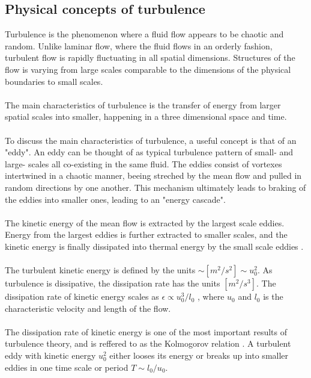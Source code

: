 \documentclass[a4paper, 12pt]{report}
\begin{document}
\subsection{Physical concepts of turbulence}
Turbulence is the phenomenon where a fluid flow appears to be chaotic and random. Unlike laminar flow, where the fluid flows in an orderly fashion, turbulent flow is rapidly fluctuating in all spatial dimensions. Structures of the flow is varying from large scales comparable to the dimensions of the physical boundaries to small scales.\\
\\
The main characteristics of turbulence is the transfer of energy from larger spatial scales into smaller, happening in a three dimensional space and time.\\
\\
 To discuss the main characteristics of turbulence, a useful concept is that of an "eddy". An eddy can be thought of as typical turbulence pattern of small- and large- scales all co-existing in the same fluid. The eddies consist of vortexes intertwined in a chaotic manner, beeing streched by the mean flow and pulled in random directions by one another. This mechanism ultimately leads to braking of the eddies into smaller ones, leading to an "energy cascade"\cite{CFD}.\\
\\
The kinetic energy of the mean flow is extracted by the largest scale eddies. Energy from the largest eddies is further extracted to smaller scales, and the kinetic energy is finally dissipated into thermal energy by the small scale eddies \cite{CFD}.\\
\\
The turbulent kinetic energy is defined by the units $\sim [m^2/s^2] \sim u_0^2$. As turbulence is dissipative, the dissipation rate has the units $[m^2/s^3]$. The dissipation rate of kinetic energy scales as $\epsilon \propto u_0^3/l_0$ \cite{Turbulence}, where $u_0$ and $l_0$ is the characteristic velocity and length of the flow.\\
\\
The dissipation rate of kinetic energy is one of the most important results of turbulence theory, and is reffered to as the Kolmogorov relation \cite{Turbulence}. A turbulent eddy with kinetic energy $u_0^2$ either looses its energy or breaks up into smaller eddies in one time scale or period $T \sim l_0/u_0$.\\
\\
\end{document}

